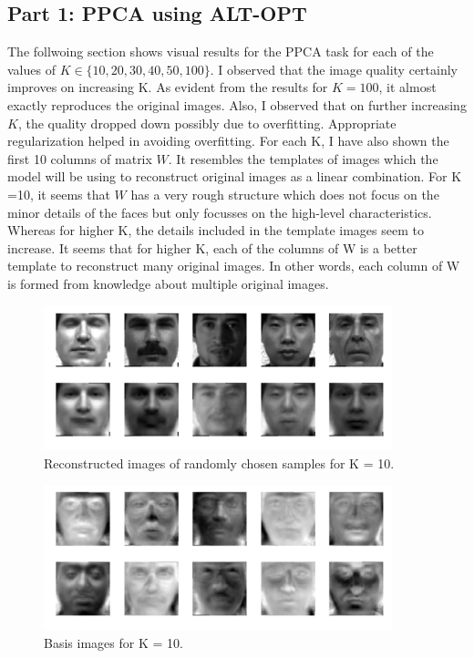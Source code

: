 \documentclass[a4paper,11pt]{article}
\begin{document}
\begin{mlsolution}

\subsection{Part 1: PPCA using ALT-OPT}
The follwoing section shows visual results for the PPCA task for each of the values of $K \in \{10,20,30,40,50,100\}$. I observed that the image quality certainly improves on increasing K. As evident from the results for $K = 100$, it almost exactly reproduces the original images. Also, I observed that on further increasing $K$, the quality dropped down possibly due to overfitting. Appropriate regularization helped in avoiding overfitting. For each K, I have also shown the first 10 columns of matrix $W$. It resembles the templates of images which the model will be using to reconstruct original images as a linear combination. For K =10, it seems that $W$ has a very rough structure which does not focus on the minor details of the faces but only focusses on the high-level characteristics. Whereas for higher K, the details included in the template images seem to increase. It seems that for higher K, each of the columns of W is a better template to reconstruct many original images. In other words, each column of W is formed from knowledge about multiple original images.
\begin{figure}[!htbp]
	\centering
	\includegraphics[width=0.9\textwidth, height=0.4\linewidth]{images/img_k_10.png}
	\caption[k = 10]{Reconstructed images of randomly chosen samples for K = 10.}
\end{figure}
\begin{figure}[!htbp]
	\centering
	\includegraphics[width=0.9\textwidth, height=0.4\linewidth]{images/template_weights_k_10.png}
	\caption[k = 10]{Basis images for K = 10.}
\end{figure}



\end{mlsolution}
\end{document}
